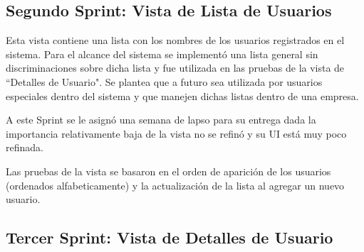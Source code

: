     
    
    
    \subsection{Segundo Sprint: Vista de Lista de Usuarios}
    
    Esta vista contiene una lista con los nombres de los usuarios registrados en el sistema. Para el alcance del sistema se implementó una lista general sin discriminaciones sobre dicha lista y fue utilizada en las pruebas de la vista de ``Detalles de Usuario". Se plantea que a futuro sea utilizada por usuarios especiales dentro del sistema y que manejen dichas listas dentro de una empresa.
    
    A este Sprint se le asignó una semana de lapso para su entrega dada la importancia relativamente baja de la vista no se refinó y su UI está muy poco refinada.
    
    Las pruebas de la vista se basaron en el orden de aparición de los usuarios (ordenados alfabeticamente) y la actualización de la lista al agregar un nuevo usuario.
    
    \subsection{Tercer Sprint: Vista de Detalles de Usuario}
    
